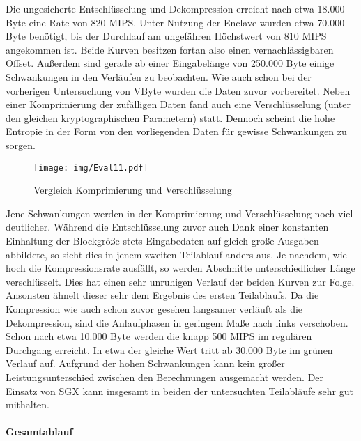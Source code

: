 Die ungesicherte Entschlüsselung und Dekompression erreicht nach etwa 18.000 Byte eine Rate von 820 \ac{MIPS}. Unter Nutzung der Enclave wurden etwa 70.000 Byte benötigt, bis der Durchlauf am ungefähren Höchstwert von 810 \ac{MIPS} angekommen ist. Beide Kurven besitzen fortan also einen vernachlässigbaren Offset. Außerdem sind gerade ab einer Eingabelänge von 250.000 Byte einige Schwankungen in den Verläufen zu beobachten. Wie auch schon bei der vorherigen Untersuchung von VByte wurden die Daten zuvor vorbereitet. Neben einer Komprimierung der zufälligen Daten fand auch eine Verschlüsselung (unter den gleichen kryptographischen Parametern) statt. Dennoch scheint die hohe Entropie in der Form von den vorliegenden Daten für gewisse Schwankungen zu sorgen.

\begin{figure}[h]
	\texttt{[image: img/Eval11.pdf]}
	\centering
	\caption{Vergleich Komprimierung und Verschlüsselung}
	\label{fig:eval11}
\end{figure}

Jene Schwankungen werden in der Komprimierung und Verschlüsselung noch viel deutlicher. Während die Entschlüsselung zuvor auch Dank einer konstanten Einhaltung der Blockgröße stets Eingabedaten auf gleich große Ausgaben abbildete, so sieht dies in jenem zweiten Teilablauf anders aus. Je nachdem, wie hoch die Kompressionsrate ausfällt, so werden Abschnitte unterschiedlicher Länge verschlüsselt. Dies hat einen sehr unruhigen Verlauf der beiden Kurven zur Folge. Ansonsten ähnelt dieser sehr dem Ergebnis des ersten Teilablaufs. Da die Kompression wie auch schon zuvor gesehen langsamer verläuft als die Dekompression, sind die Anlaufphasen in geringem Maße nach links verschoben. Schon nach etwa 10.000 Byte werden die knapp 500 \ac{MIPS} im regulären Durchgang erreicht. In etwa der gleiche Wert tritt ab 30.000 Byte im grünen Verlauf auf. Aufgrund der hohen Schwankungen kann kein großer Leistungsunterschied zwischen den Berechnungen ausgemacht werden. Der Einsatz von \ac{SGX} kann insgesamt in beiden der untersuchten Teilabläufe sehr gut mithalten.

\paragraph{Gesamtablauf}

